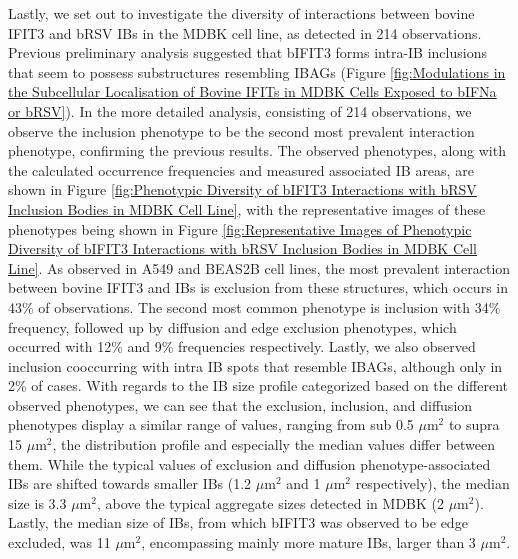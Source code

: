Lastly, we set out to investigate the diversity of interactions between bovine IFIT3 and bRSV IBs in the MDBK cell line, as detected in 214 observations. Previous preliminary analysis suggested that bIFIT3 forms intra-IB inclusions that seem to possess substructures resembling IBAGs (Figure \ref{fig:Modulations in the Subcellular Localisation of Bovine IFITs in MDBK Cells Exposed to bIFNa or bRSV}). In the more detailed analysis, consisting of 214 observations, we observe the inclusion phenotype to be the second most prevalent interaction phenotype, confirming the previous results. The observed phenotypes, along with the calculated occurrence frequencies and measured associated IB areas, are shown in Figure \ref{fig:Phenotypic Diversity of bIFIT3 Interactions with bRSV Inclusion Bodies in MDBK Cell Line}, with the representative images of these phenotypes being shown in Figure \ref{fig:Representative Images of Phenotypic Diversity of bIFIT3 Interactions with bRSV Inclusion Bodies in MDBK Cell Line}. As observed in A549 and BEAS2B cell lines, the most prevalent interaction between bovine IFIT3 and IBs is exclusion from these structures, which occurs in 43\% of observations. The second most common phenotype is inclusion with 34\% frequency, followed up by diffusion and edge exclusion phenotypes, which occurred with 12\% and 9\% frequencies respectively. Lastly, we also observed inclusion cooccurring with intra IB spots that resemble IBAGs, although only in 2\% of cases. With regards to the IB size profile categorized based on the different observed phenotypes, we can see that the exclusion, inclusion, and diffusion phenotypes display a similar range of values, ranging from sub 0.5 \(\mu \mbox{m}^2\) to supra 15 \(\mu \mbox{m}^2\), the distribution profile and especially the median values differ between them. While the typical values of exclusion and diffusion phenotype-associated IBs are shifted towards smaller IBs (1.2 \(\mu \mbox{m}^2\) and 1 \(\mu \mbox{m}^2\) respectively), the median size is 3.3 \(\mu \mbox{m}^2\), above the typical aggregate sizes detected in MDBK (2 \(\mu \mbox{m}^2\)). Lastly, the median size of IBs, from which bIFIT3 was observed to be edge excluded, was 11 \(\mu \mbox{m}^2\), encompassing mainly more mature IBs, larger than 3 \(\mu \mbox{m}^2\).

